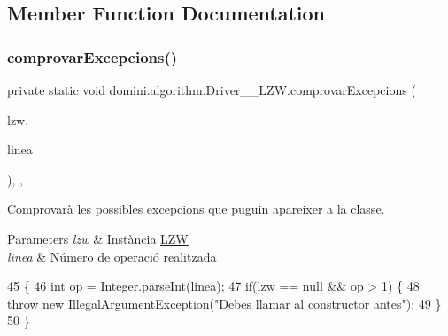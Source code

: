 \subsection{Member Function Documentation}
\mbox{\label{classdomini_1_1algorithm_1_1Driver____LZW_a3f609a2c3a22d0c7d11a5ff4e015e433}} 
\subsubsection{\texorpdfstring{comprovar\+Excepcions()}{comprovarExcepcions()}}
{\footnotesize\ttfamily private static void domini.\+algorithm.\+Driver\+\_\+\+\_\+\+L\+Z\+W.\+comprovar\+Excepcions (\begin{DoxyParamCaption}\item[{\hyperlink{classdomini_1_1algorithm_1_1LZW}{L\+ZW}}]{lzw,  }\item[{String}]{linea }\end{DoxyParamCaption})\hspace{0.3cm}{\ttfamily [inline]}, {\ttfamily [static]}, {\ttfamily [private]}}



Comprovarà les possibles excepcions que puguin apareixer a la classe. 


\begin{DoxyParams}{Parameters}
{\em lzw} & Instància \hyperlink{classdomini_1_1algorithm_1_1LZW}{L\+ZW} \\
\hline
{\em linea} & Número de operació realitzada \\
\hline
\end{DoxyParams}

\begin{DoxyCode}
45                                                                   \{
46         \textcolor{keywordtype}{int} op = Integer.parseInt(linea);
47         \textcolor{keywordflow}{if}(lzw == null && op > 1) \{
48             \textcolor{keywordflow}{throw} \textcolor{keyword}{new} IllegalArgumentException(\textcolor{stringliteral}{"Debes llamar al constructor antes"});
49         \}
50     \}
\end{DoxyCode}
\mbox{\label{classdomini_1_1algorithm_1_1Driver____LZW_a1500b5c33b09cbaad4645f6d87eecc4c}} 
